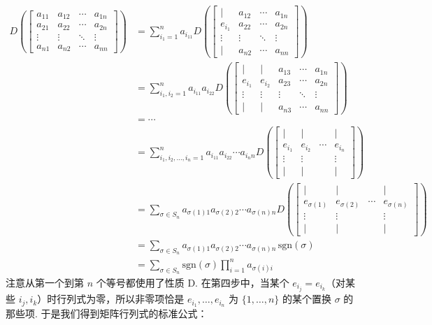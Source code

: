 \begin{align*}
D\left(\begin{bmatrix}a_{11}&a_{12}&\cdots&a_{1n}\\a_{21}&a_{22}&\cdots&a_{2n}\\\vdots&\vdots&\ddots&\vdots\\a_{n1}&a_{n2}&\cdots&a_{nn}\end{bmatrix}\right)
&=\sum_{i_1=1}^{n}a_{i_11}D\left(\begin{bmatrix}|&a_{12}&\cdots&a_{1n}\\e_{i_1}&a_{22}&\cdots&a_{2n}\\\vdots&\vdots&\ddots&\vdots\\|&a_{n2}&\cdots&a_{nn}\end{bmatrix}\right)\\
&=\sum_{i_1,i_2=1}^{n}a_{i_11}a_{i_22}D\left(\begin{bmatrix}|&|&a_{13}&\cdots&a_{1n}\\e_{i_1}&e_{i_2}&a_{23}&\cdots&a_{2n}\\\vdots&\vdots&\vdots&\ddots&\vdots\\|&|&a_{n3}&\cdots&a_{nn}\end{bmatrix}\right)\\
&=\cdots\\
&=\sum_{i_1,i_2,\ldots,i_n=1}^{n}a_{i_11}a_{i_22}\cdots a_{i_nn}
  D\left(\begin{bmatrix}|&|&&|\\e_{i_1}&e_{i_2}&\cdots&e_{i_n}\\\vdots&\vdots&&\vdots\\|&|&&|\end{bmatrix}\right)\\
&=\sum_{\sigma\in S_n}a_{\sigma(1)1}a_{\sigma(2)2}\cdots a_{\sigma(n)n}
  D\left(\begin{bmatrix}|&|&&|\\e_{\sigma(1)}&e_{\sigma(2)}&\cdots&e_{\sigma(n)}\\\vdots&\vdots&&\vdots\\|&|&&|\end{bmatrix}\right)\\
&=\sum_{\sigma\in S_n}a_{\sigma(1)1}a_{\sigma(2)2}\cdots a_{\sigma(n)n}\,\mathrm{sgn}(\sigma)\\
&=\sum_{\sigma\in S_n}\mathrm{sgn}(\sigma)\prod_{i=1}^{n}a_{\sigma(i)i}
\end{align*}
注意从第一个到第 $n$ 个等号都使用了性质 D. 在第四步中，当某个 $e_{i_j}=e_{i_k}$（对某些 $i_j,i_k$）时行列式为零，所以非零项恰是 $e_{i_1},\ldots,e_{i_n}$ 为 $\{1,\ldots,n\}$ 的某个置换 $\sigma$ 的那些项. 于是我们得到矩阵行列式的标准公式：

